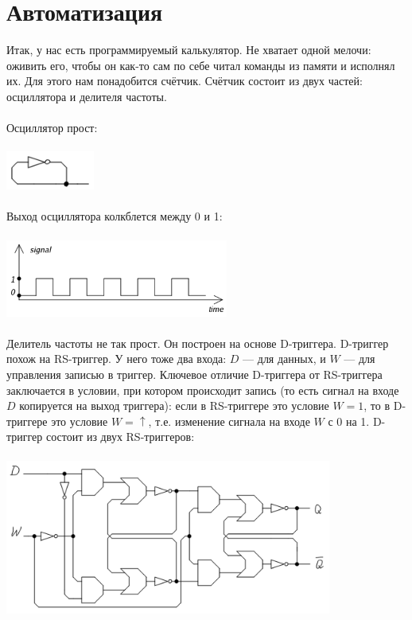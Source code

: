 \documentclass[11pt]{book}
\begin{document}
\section{Автоматизация}
Итак, у нас есть программируемый калькулятор.
Не хватает одной мелочи: оживить его, чтобы он как-то сам по себе читал команды из памяти и исполнял их.
Для этого нам понадобится счётчик.
Счётчик состоит из двух частей: осциллятора и делителя частоты.
\\ \\
Осциллятор прост:
\\ \\
\includegraphics[height=0.5in]{pic/oscillator.png}
\\ \\
Выход осциллятора колкблется между 0 и 1:
\\ \\
\includegraphics[height=1in]{pic/oscillator_plot.png}
\\ \\
Делитель частоты не так прост.
Он построен на основе D-триггера.
D-триггер похож на RS-триггер.
У него тоже два входа: $D$ --- для данных, и $W$ --- для управления записью в триггер.
Ключевое отличие D-триггера от RS-триггера заключается в условии, при котором происходит запись (то есть сигнал на входе $D$ копируется на выход триггера):
если в RS-триггере это условие $W=1$, то в D-триггере это условие $W=\uparrow$, т.е. изменение сигнала на входе $W$ с 0 на 1.
D-триггер состоит из двух RS-триггеров:
\\ \\
\includegraphics[height=2in]{pic/d_trigger.png}
\end{document}

